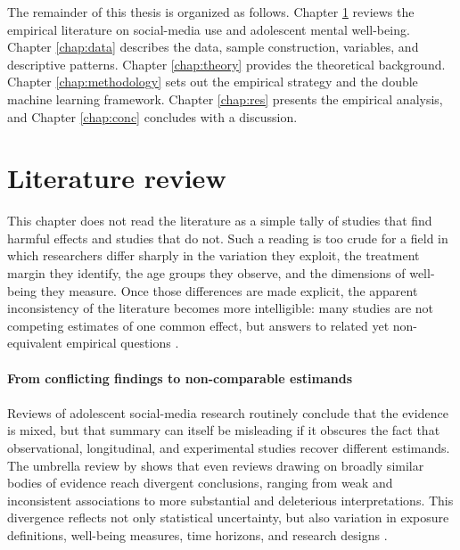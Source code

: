 \documentclass[11pt,oneside,a4paper]{book}
\newcommand{\tocchapter}[2]{%
  \chapter[#1]{#2}%
}
\begin{document}
The remainder of this thesis is organized as follows. Chapter \ref{chap:LR}
reviews the empirical literature on social-media use and adolescent mental
well-being. Chapter \ref{chap:data} describes the data, sample construction,
variables, and descriptive patterns. Chapter \ref{chap:theory} provides the
theoretical background. Chapter \ref{chap:methodology} sets out the empirical
strategy and the double machine learning framework. Chapter \ref{chap:res}
presents the empirical analysis, and Chapter \ref{chap:conc} concludes with a
discussion.

\tocchapter{Literature Review}{Literature review}
\label{chap:LR}

This chapter does not read the literature as a simple tally of studies that find harmful effects and studies that do not. Such a reading is too crude for a field in which researchers differ sharply in the variation they exploit, the treatment margin they identify, the age groups they observe, and the dimensions of well-being they measure. Once those differences are made explicit, the apparent inconsistency of the literature becomes more intelligible: many studies are not competing estimates of one common effect, but answers to related yet non-equivalent empirical questions \citep{twenge2018newmedia,orbenprzybylski2019association,allcott2020welfare,braghieri2022socialmedia,valkenburg2022umbrella}.\\
\\
\textbf{From conflicting findings to non-comparable estimands}\\
\\
Reviews of adolescent social-media research routinely conclude that the evidence is mixed, but that summary can itself be misleading if it obscures the fact that observational, longitudinal, and experimental studies recover different estimands. The umbrella review by \citet{valkenburg2022umbrella} shows that even reviews drawing on broadly similar bodies of evidence reach divergent conclusions, ranging from weak and inconsistent associations to more substantial and deleterious interpretations. This divergence reflects not only statistical uncertainty, but also variation in exposure definitions, well-being measures, time horizons, and research designs \citep{valkenburg2022umbrella}. 
\end{document}
